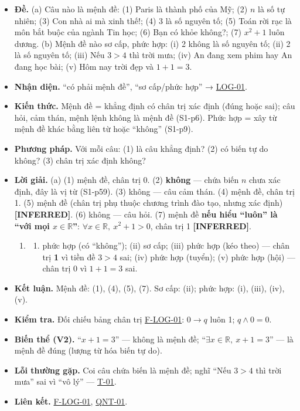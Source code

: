 \documentclass[
  10pt,
  twoside,openany]{book}
\providecommand{\tightlist}{%
  \setlength{\itemsep}{0pt}\setlength{\parskip}{0pt}}
\begin{document}
\begin{itemize}
\tightlist
\item
  \textbf{Đề.} (a) Câu nào là mệnh đề: (1) Paris là thành phố của Mỹ;
  (2) \(n\) là số tự nhiên; (3) Con nhà ai mà xinh thế!; (4) 3 là số
  nguyên tố; (5) Toán rời rạc là môn bắt buộc của ngành Tin học; (6) Bạn
  có khỏe không?; (7) \(x^2+1\) luôn dương. (b) Mệnh đề nào sơ cấp, phức
  hợp: (i) 2 không là số nguyên tố; (ii) 2 là số nguyên tố; (iii) Nếu
  \(3>4\) thì trời mưa; (iv) An đang xem phim hay An đang học bài; (v)
  Hôm nay trời đẹp và \(1+1=3\).
\item
  \textbf{Nhận diện.} ``có phải mệnh đề'', ``sơ cấp/phức hợp'' →
  \protect\hyperlink{LOG-01}{LOG-01}.
\item
  \textbf{Kiến thức.} Mệnh đề = khẳng định có chân trị xác định (đúng
  hoặc sai); câu hỏi, cảm thán, mệnh lệnh không là mệnh đề (S1-p6). Phức
  hợp = xây từ mệnh đề khác bằng liên từ hoặc ``không'' (S1-p9).
\item
  \textbf{Phương pháp.} Với mỗi câu: (1) là câu khẳng định? (2) có biến
  tự do không? (3) chân trị xác định không?
\item
  \textbf{Lời giải.} (a) (1) mệnh đề, chân trị 0. (2) \textbf{không} ---
  chứa biến \(n\) chưa xác định, đây là vị từ (S1-p59). (3) không ---
  câu cảm thán. (4) mệnh đề, chân trị 1. (5) mệnh đề (chân trị phụ thuộc
  chương trình đào tạo, nhưng xác định) \textbf{{[}INFERRED{]}}. (6)
  không --- câu hỏi. (7) mệnh đề \textbf{nếu hiểu ``luôn'' là ``với mọi
  \(x\in\mathbb R\)''}: \(\forall x\in\mathbb R,\ x^2+1>0\), chân trị 1
  \textbf{{[}INFERRED{]}}.

  \begin{enumerate}
  \def\labelenumi{(\alph{enumi})}
  \setcounter{enumi}{1}
  \item
    \begin{enumerate}
    \def\labelenumii{(\roman{enumii})}
    \tightlist
    \item
      phức hợp (có ``không''); (ii) sơ cấp; (iii) phức hợp (kéo theo)
      --- chân trị \textbf{1} vì tiền đề \(3>4\) sai; (iv) phức hợp
      (tuyển); (v) phức hợp (hội) --- chân trị 0 vì \(1+1=3\) sai.
    \end{enumerate}
  \end{enumerate}
\item
  \textbf{Kết luận.} Mệnh đề: (1), (4), (5), (7). Sơ cấp: (ii); phức
  hợp: (i), (iii), (iv), (v).
\item
  \textbf{Kiểm tra.} Đối chiếu bảng chân trị
  \protect\hyperlink{F-LOG-01}{F-LOG-01}: \(0\to q\) luôn 1;
  \(q\wedge0=0\).
\item
  \textbf{Biến thể (V2).} ``\(x+1=3\)'' --- không là mệnh đề;
  ``\(\exists x\in\mathbb R,\ x+1=3\)'' --- là mệnh đề đúng (lượng từ
  hóa biến tự do).
\item
  \textbf{Lỗi thường gặp.} Coi câu chứa biến là mệnh đề; nghĩ ``Nếu
  \(3>4\) thì trời mưa'' sai vì ``vô lý'' ---
  \protect\hyperlink{T-01}{T-01}.
\item
  \textbf{Liên kết.} \protect\hyperlink{F-LOG-01}{F-LOG-01},
  \protect\hyperlink{QNT-01}{QNT-01}.
\end{itemize}
\end{document}
